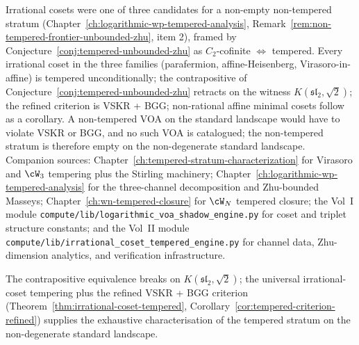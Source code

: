 Irrational cosets were one of three candidates for a non-empty
non-tempered stratum
(Chapter~\ref{ch:logarithmic-wp-tempered-analysis},
Remark~\ref{rem:non-tempered-frontier-unbounded-zhu}, item 2), framed
by Conjecture~\ref{conj:tempered-unbounded-zhu} as $C_2$-cofinite
$\Leftrightarrow$ tempered. Every irrational coset in the three
families (parafermion, affine-Heisenberg, Virasoro-in-affine) is
tempered unconditionally; the contrapositive of
Conjecture~\ref{conj:tempered-unbounded-zhu} retracts on the witness
$K(\mathfrak{sl}_2, \sqrt{2})$; the refined criterion is VSKR + BGG;
non-rational affine minimal cosets follow as a corollary. A
non-tempered VOA on the standard landscape would have to violate
VSKR or BGG, and no such VOA is catalogued; the non-tempered stratum
is therefore empty on the non-degenerate standard landscape.
Companion sources: Chapter~\ref{ch:tempered-stratum-characterization}
for Virasoro and $\cW_3$ tempering plus the Stirling machinery;
Chapter~\ref{ch:logarithmic-wp-tempered-analysis} for the
three-channel decomposition and Zhu-bounded Masseys;
Chapter~\ref{ch:wn-tempered-closure} for $\cW_N$ tempered closure;
the Vol~I module
\texttt{compute/lib/logarithmic\_voa\_shadow\_engine.py} for coset
and triplet structure constants; and the Vol~II module
\texttt{compute/lib/irrational\_coset\_tempered\_engine.py} for
channel data, Zhu-dimension analytics, and verification
infrastructure.

The contrapositive equivalence breaks on
$K(\mathfrak{sl}_2, \sqrt{2})$; the universal irrational-coset
tempering plus the refined VSKR + BGG criterion
(Theorem~\ref{thm:irrational-coset-tempered},
Corollary~\ref{cor:tempered-criterion-refined}) supplies the
exhaustive characterisation of the tempered stratum on the
non-degenerate standard landscape.

